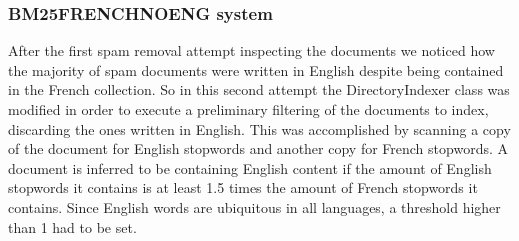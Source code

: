 \subsubsection{BM25FRENCHNOENG system}
\label{subsub:BM25FRENCHNOENG}
After the first spam removal attempt inspecting the documents we noticed how the majority of spam documents were written in English despite being contained in the French collection.
So in this second attempt the DirectoryIndexer class was modified in order to execute a preliminary filtering of the documents to index, discarding the ones written in English.
This was accomplished by scanning a copy of the document for English stopwords and another copy for French stopwords. A document is inferred to be containing English content if the amount of English stopwords it contains is at least 1.5 times the amount of French stopwords it contains. Since English words are ubiquitous in all languages, a threshold higher than 1 had to be set.


